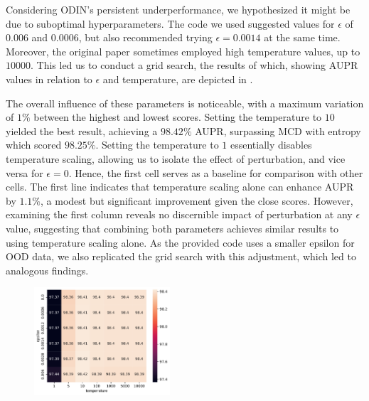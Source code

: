 Considering ODIN's persistent underperformance, we hypothesized it might be due to suboptimal hyperparameters. The code we used suggested values for $ \epsilon $ of $0.006$ and $0.0006$, but also recommended trying $ \epsilon = 0.0014 $ at the same time. Moreover, the original paper sometimes employed high temperature values, up to $10000$. This led us to conduct a grid search, the results of which, showing AUPR values in relation to $ \epsilon $ and temperature, are depicted in .

The overall influence of these parameters is noticeable, with a maximum variation of $1\%$ between the highest and lowest scores. Setting the temperature to $ 10 $ yielded the best result, achieving a $98.42\%$ AUPR, surpassing MCD with entropy which scored $98.25\%$. Setting the temperature to $ 1 $ essentially disables temperature scaling, allowing us to isolate the effect of perturbation, and vice versa for $ \epsilon = 0 $. Hence, the first cell serves as a baseline for comparison with other cells. The first line indicates that temperature scaling alone can enhance AUPR by $1.1\%$, a modest but significant improvement given the close scores. However, examining the first column reveals no discernible impact of perturbation at any $ \epsilon $ value, suggesting that combining both parameters achieves similar results to using temperature scaling alone. As the provided code uses a smaller epsilon for OOD data, we also replicated the grid search with this adjustment, which led to analogous findings.
\begin{figure}[H]
    \centering
    \includegraphics[width=0.45\textwidth]{odin_grid_search.pdf}
    \caption{}
    \label{fig:odin_grid_search}
\end{figure}